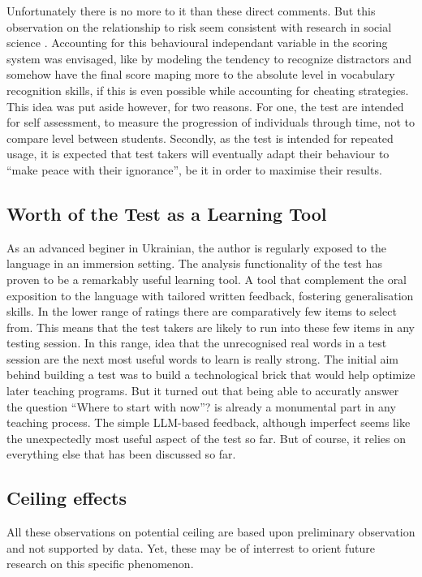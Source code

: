 Unfortunately there is no more to it than these direct comments. But this observation on the relationship to risk seem consistent with research in social science \parencite{wang_does_2023}. Accounting for this behavioural independant variable in the scoring system was envisaged, like by modeling the tendency to recognize distractors and somehow have the final score maping more to the absolute level in vocabulary recognition skills, if this is even possible while accounting for cheating strategies. This idea was put aside however, for two reasons. For one, the test are intended for self assessment, to measure the progression of individuals through time, not to compare level between students. Secondly, as the test is intended for repeated usage, it is expected that test takers will eventually adapt their behaviour to ``make peace with their ignorance'', be it in order to maximise their results.

\subsection{Worth of the Test as a Learning Tool}
As an advanced beginer in Ukrainian, the author is regularly exposed to the language in an immersion setting. The analysis functionality of the test has proven to be a remarkably useful learning tool. A tool that complement the oral exposition to the language with tailored written feedback, fostering generalisation skills. In the lower range of ratings there are comparatively few items to select from. This means that the test takers are likely to run into these few items in any testing session. In this range, idea that the unrecognised real words in a test session are the next most useful words to learn is really strong. The initial aim behind building a test was to build a technological brick that would help optimize later teaching programs. But it turned out that being able to accuratly answer the question ``Where to start with now''? is already a monumental part in any teaching process. The simple LLM-based feedback, although imperfect seems like the unexpectedly most useful aspect of the test so far. But of course, it relies on everything else that has been discussed so far.

\subsection{Ceiling effects}
All these observations on potential ceiling are based upon preliminary observation and not supported by data. Yet, these may be of interrest to orient future research on this specific phenomenon. 

